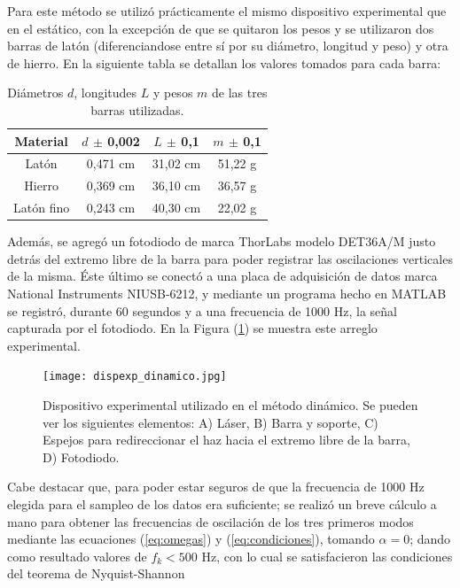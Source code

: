 \documentclass[twoside,twocolumn,a4paper]{article}
\begin{document}
Para este m\'etodo se utiliz\'o pr\'acticamente el mismo dispositivo experimental que en el est\'atico, con la excepci\'on de que se quitaron los pesos y se utilizaron dos barras de lat\'on (diferenciandose entre s\'i por su di\'ametro, longitud y peso) y otra de hierro. En la siguiente tabla se detallan los valores tomados para cada barra:\newline

\begin{table}[H]
\centering
\caption{Di\'ametros $d$, longitudes $L$ y pesos $m$ de las tres barras utilizadas.}
\label{tab:valoresbarras}
\begin{tabular}{|c|c|c|c|}
\hline
Material & $d$ $\pm$ 0,002 & $L$ $\pm$ 0,1 & $m$ $\pm$ 0,1\\ \hline
Lat\'on & 0,471 cm & 31,02 cm & 51,22 g\\ \hline
Hierro & 0,369 cm & 36,10 cm & 36,57 g  \\ \hline
Lat\'on fino & 0,243 cm & 40,30 cm & 22,02 g \\ \hline
\end{tabular}
\end{table}


Adem\'as, se agreg\'o un fotodiodo de  marca ThorLabs modelo DET36A/M justo detr\'as del extremo libre de la barra para poder registrar las oscilaciones verticales de la misma. \newline
\'Este \'ultimo se conect\'o a una placa de adquisici\'on de datos marca National Instruments NIUSB-6212, y mediante un programa hecho en MATLAB se registr\'o, durante 60 segundos y a una frecuencia de 1000 Hz, la se\~nal capturada por el fotodiodo. En la Figura (\ref{fig:dispexp_dinamico}) se muestra este arreglo experimental.

\begin{figure}[H]
\texttt{[image: dispexp\_dinamico.jpg]}
\caption{Dispositivo experimental utilizado en el m\'etodo din\'amico. Se pueden ver los siguientes elementos: A) L\'aser, B) Barra y soporte, C) Espejos para redireccionar el haz hacia el extremo libre de la barra, D) Fotodiodo.}
\label{fig:dispexp_dinamico}
\end{figure}

Cabe destacar que, para poder estar seguros de que la frecuencia de 1000 Hz elegida para el sampleo de los datos era suficiente; se realiz\'o un breve c\'alculo a mano para obtener las frecuencias de oscilaci\'on de los tres primeros modos mediante las ecuaciones (\ref{eq:omegas}) y (\ref{eq:condiciones}), tomando $\alpha = 0$; dando como resultado valores de $f_{k} < 500$ Hz, con lo cual se satisfacieron las condiciones del teorema de Nyquist-Shannon \cite{teo:shannon}
\end{document}
